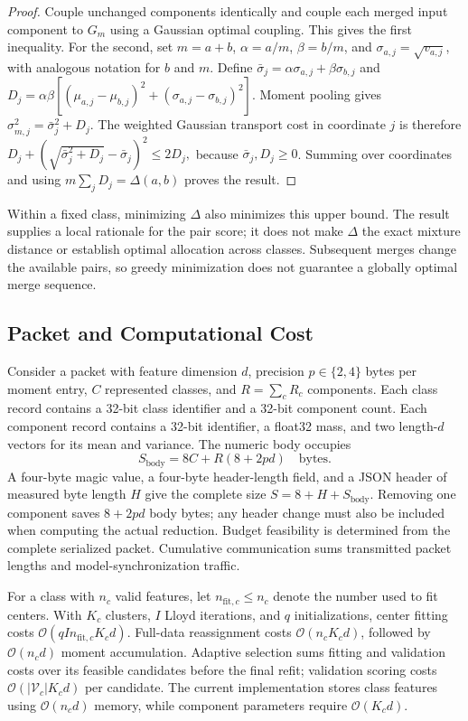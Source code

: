 \begin{proof}
Couple unchanged components identically and couple each merged input component to $G_m$ using a Gaussian optimal coupling. This gives the first inequality. For the second, set $m=a+b$, $\alpha=a/m$, $\beta=b/m$, and $\sigma_{a,j}=\sqrt{v_{a,j}}$, with analogous notation for $b$ and $m$. Define $\bar\sigma_j=\alpha\sigma_{a,j}+\beta\sigma_{b,j}$ and
$
D_j=\alpha\beta\left[
(\mu_{a,j}-\mu_{b,j})^2+
(\sigma_{a,j}-\sigma_{b,j})^2
\right].
$
Moment pooling gives $\sigma_{m,j}^2=\bar\sigma_j^2+D_j$. The weighted Gaussian transport cost in coordinate $j$ is therefore
$
D_j+
\left(\sqrt{\bar\sigma_j^2+D_j}-\bar\sigma_j\right)^2
\leq 2D_j,
$
because $\bar\sigma_j,D_j\geq0$. Summing over coordinates and using $m\sum_jD_j=\Delta(a,b)$ proves the result.
\end{proof}

Within a fixed class, minimizing $\Delta$ also minimizes this upper bound. The result supplies a local rationale for the pair score; it does not make $\Delta$ the exact mixture distance or establish optimal allocation across classes. Subsequent merges change the available pairs, so greedy minimization does not guarantee a globally optimal merge sequence.

\subsection{Packet and Computational Cost}

Consider a packet with feature dimension $d$, precision $p\in\{2,4\}$ bytes per moment entry, $C$ represented classes, and $R=\sum_cR_c$ components. Each class record contains a 32-bit class identifier and a 32-bit component count. Each component record contains a 32-bit identifier, a float32 mass, and two length-$d$ vectors for its mean and variance. The numeric body occupies
\begin{equation}
\label{eq:bytes}
S_{\mathrm{body}}
=
8C+R(8+2pd)
\quad\text{bytes}.
\end{equation}
A four-byte magic value, a four-byte header-length field, and a JSON header of measured byte length $H$ give the complete size $S=8+H+S_{\mathrm{body}}$. Removing one component saves $8+2pd$ body bytes; any header change must also be included when computing the actual reduction. Budget feasibility is determined from the complete serialized packet. Cumulative communication sums transmitted packet lengths and model-synchronization traffic.

For a class with $n_c$ valid features, let $n_{\mathrm{fit},c}\leq n_c$ denote the number used to fit centers. With $K_c$ clusters, $I$ Lloyd iterations, and $q$ initializations, center fitting costs $\mathcal O(qI n_{\mathrm{fit},c}K_cd)$. Full-data reassignment costs $\mathcal O(n_cK_cd)$, followed by $\mathcal O(n_cd)$ moment accumulation. Adaptive selection sums fitting and validation costs over its feasible candidates before the final refit; validation scoring costs $\mathcal O(|\mathcal V_c|K_cd)$ per candidate. The current implementation stores class features using $\mathcal O(n_cd)$ memory, while component parameters require $\mathcal O(K_cd)$.

